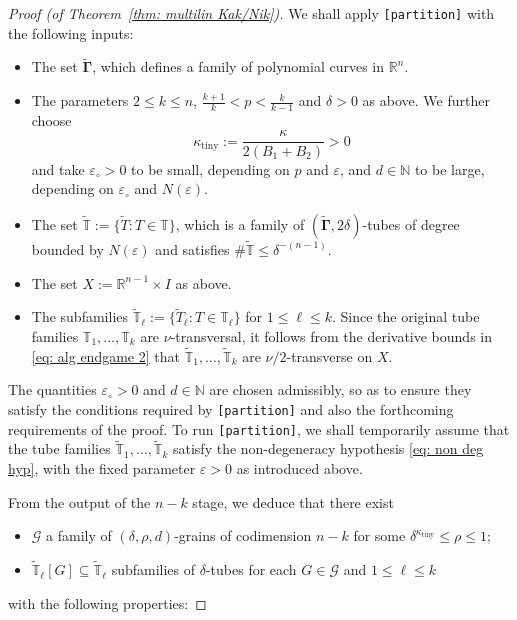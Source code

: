 \documentclass[reqno]{amsart}
\numberwithin{equation}{section}
\newcommand{\N}{\mathbb{N}}
\newcommand{\R}{\mathbb{R}}
\newcommand{\T}{\mathbb{T}}
\newcommand{\cG}{\mathcal{G}}
\newcommand{\bdGamma}{\boldsymbol{\Gamma}}
\theoremstyle{plain}
\theoremstyle{definition}
\newcommand{\ttiny}{\mathrm{tiny}}
\begin{document}
\begin{proof}[Proof (of Theorem~\ref{thm: multilin Kak/Nik})]
We shall apply \texttt{[partition]} with the following inputs: 
\begin{itemize}
    \item The set $\widetilde{\bdGamma}$, which defines a family of polynomial curves in $\R^n$.
     \item The parameters $2 \leq k \leq n$, $\frac{k+1}{k} < p < \frac{k}{k-1}$ and $\delta > 0$ as above. We further choose 
     \begin{equation}\label{eq: choose kappa tiny}
         \kappa_{\ttiny} := \frac{\kappa}{2(B_1 + B_2)} > 0
     \end{equation}
     and take $\varepsilon_{\circ} > 0$  to be small, depending on $p$ and $\varepsilon$, and $d \in \N$ to be large, depending on $\varepsilon_{\circ}$ and $N(\varepsilon)$.
    \item The set $\widetilde{\T} := \{\widetilde{T} : T \in \T\}$, which is a family of $(\widetilde{\bdGamma}, 2\delta)$-tubes of degree bounded by $N(\varepsilon)$ and satisfies $\#\widetilde{\T} \leq \delta^{-(n-1)}$. 
     \item The set $X := \R^{n-1} \times I$ as above.
    \item The subfamilies $\widetilde{\T}_{\ell} := \{\widetilde{T}_{\ell} : T \in \T_{\ell}\}$ for $1 \leq \ell \leq k$. Since the original tube families $\T_1, \dots, \T_k$ are $\nu$-transversal, it follows from the derivative bounds in \eqref{eq: alg endgame 2} that $\widetilde{\T}_1, \dots, \widetilde{\T}_k$ are $\nu/2$-transverse on $X$.
\end{itemize}
The quantities $\varepsilon_{\circ} > 0$ and $d \in \N$ are chosen admissibly, so as to ensure they satisfy the conditions required by \texttt{[partition]} and also the forthcoming requirements of the proof. To run \texttt{[partition]}, we shall temporarily assume that the tube families $\widetilde{\T}_1, \dots, \widetilde{\T}_k$ satisfy the non-degeneracy hypothesis \eqref{eq: non deg hyp}, with the fixed parameter $\varepsilon > 0$ as introduced above. 


From the output of the $n-k$ stage, we deduce that there exist
\begin{itemize}
    \item $\cG$ a family of $(\delta, \rho, d)$-grains of codimension $n-k$ for some $\delta^{\kappa_{\ttiny}} \leq \rho \leq 1$;
    \item $\widetilde{\T}_{\ell}[G] \subseteq \widetilde{\T}_{\ell}$ subfamilies of $\delta$-tubes for each $G \in \cG$ and $1 \leq \ell \leq k$
\end{itemize}
with the following properties: \medskip


\end{proof}
\end{document}
